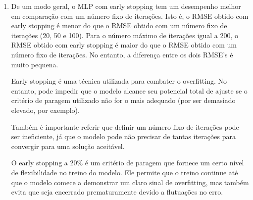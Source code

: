 \documentclass[a4paper,12pt]{article} %
\begin{document}
\begin{enumerate}
\begin{lstlisting}[language=Python]
def const(x): return average_rmse_old

# Plot the RMSE
plt.plot(iter_array, new_rmse_array, '-o', label='Different max iteration MLP')
plt.hlines(average_rmse_old, xmin=min(iter_array), xmax=max(iter_array), colors='r', linestyles='dashed', label = 'Early stopping MLP')
plt.xlabel('Number of iterations') 
plt.ylabel('RMSE')
plt.title('RMSE vs number of iterations')
plt.legend()
plt.savefig('ex3_rmse.png')
plt.show()
\end{lstlisting}

\item De um modo geral, o MLP com early stopping tem um desempenho melhor em comparação com um número fixo de iterações. Isto é, o RMSE obtido com early stopping é menor do que o RMSE obtido com um número fixo de iterações (20, 50 e 100).
Para o número máximo de iterações igual a 200, o RMSE obtido com early stopping é maior do que o RMSE obtido com um número fixo de iterações. No entanto, a diferença entre os dois RMSE's é muito pequena.

Early stopping é uma técnica utilizada para combater o overfitting. No entanto, pode impedir que o modelo alcance seu potencial total de ajuste se o critério de paragem utilizado não for o mais adequado (por ser demasiado elevado, por exemplo).

Também é importante referir que definir um número fixo de iterações pode ser ineficiente, já que o modelo pode não precisar de tantas iterações para convergir para uma solução aceitável. 

O early stopping a 20\% é um critério de paragem que fornece um certo nível de flexibilidade no treino do modelo. Ele permite que o treino continue até que o modelo comece a demonstrar um claro sinal de overfitting, mas também evita que seja encerrado prematuramente devido a flutuações no erro.

\end{enumerate}
\end{document}
